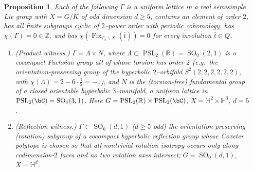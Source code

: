 \documentclass[12pt]{article}
\newcommand{\bR}{\mathbb{R}}
\newcommand{\bZ}{\mathbb{Z}}
\newcommand{\bH}{\mathbb{H}}
\newcommand{\Fix}{\operatorname{Fix}}
\DeclareMathOperator{\SO}{SO}
\DeclareMathOperator{\PSL}{PSL}
\newtheorem{proposition}{Proposition}
\theoremstyle{definition}
\begin{document}
\begin{proposition}\label{prop:witness}
Each of the following $\Gamma$ is a uniform lattice in a real semisimple Lie group
with $X=G/K$ of odd dimension $d\ge5$, contains an element of order $2$, has all
finite subgroups cyclic of $2$--power order with periodic cohomology, has
$\chi(\Gamma)=0\in\bZ$, and has $\chi(\Fix_{\Gamma_0\backslash X}(\bar t))=0$ for
every involution $\bar t\in Q$.
\begin{enumerate}
\item[\textup{(A)}] \emph{(Product witness.)} $\Gamma=\Lambda\times N$, where
$\Lambda\subset\PSL_2(\bR)=\SO_0(2,1)$ is a cocompact Fuchsian group all of whose
torsion has order $2$ (e.g.\ the orientation-preserving group of the hyperbolic
$2$--orbifold $S^2(2,2,2,2,2,2)$, with $\chi(\Lambda)=2-6\cdot\tfrac12=-1$), and
$N$ is the (torsion-free) fundamental group of a closed orientable hyperbolic
$3$--manifold, a uniform lattice in $\PSL_2(\bC)=\SO_0(3,1)$.  Here
$G=\PSL_2(\bR)\times\PSL_2(\bC)$, $X=\bH^2\times\bH^3$, $d=5$.
\item[\textup{(B)}] \emph{(Reflection witness.)} $\Gamma\subset\SO_0(d,1)$
($d\ge5$ odd) the orientation-preserving (rotation) subgroup of a cocompact
hyperbolic reflection group whose Coxeter polytope is chosen so that all nontrivial
rotation isotropy occurs only along codimension-$2$ faces and no two rotation axes
intersect; $G=\SO_0(d,1)$, $X=\bH^d$.
\end{enumerate}
\end{proposition}
\end{document}
